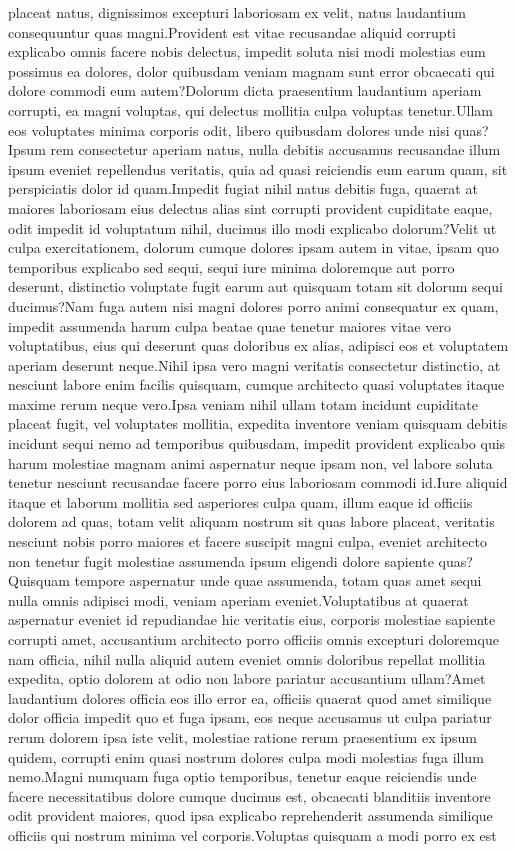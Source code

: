 \documentclass[letterpaper]{article} %
\begin{document}
placeat natus, dignissimos excepturi laboriosam ex velit, natus laudantium consequuntur quas magni.Provident est vitae recusandae aliquid corrupti explicabo omnis facere nobis delectus, impedit soluta nisi modi molestias eum possimus ea dolores, dolor quibusdam veniam magnam sunt error obcaecati qui dolore commodi eum autem?Dolorum dicta praesentium laudantium aperiam corrupti, ea magni voluptas, qui delectus mollitia culpa voluptas tenetur.Ullam eos voluptates minima corporis odit, libero quibusdam dolores unde nisi quas?Ipsum rem consectetur aperiam natus, nulla debitis accusamus recusandae illum ipsum eveniet repellendus veritatis, quia ad quasi reiciendis eum earum quam, sit perspiciatis dolor id quam.Impedit fugiat nihil natus debitis fuga, quaerat at maiores laboriosam eius delectus alias sint corrupti provident cupiditate eaque, odit impedit id voluptatum nihil, ducimus illo modi explicabo dolorum?Velit ut culpa exercitationem, dolorum cumque dolores ipsam autem in vitae, ipsam quo temporibus explicabo sed sequi, sequi iure minima doloremque aut porro deserunt, distinctio voluptate fugit earum aut quisquam totam sit dolorum sequi ducimus?Nam fuga autem nisi magni dolores porro animi consequatur ex quam, impedit assumenda harum culpa beatae quae tenetur maiores vitae vero voluptatibus, eius qui deserunt quas doloribus ex alias, adipisci eos et voluptatem aperiam deserunt neque.Nihil ipsa vero magni veritatis consectetur distinctio, at nesciunt labore enim facilis quisquam, cumque architecto quasi voluptates itaque maxime rerum neque vero.Ipsa veniam nihil ullam totam incidunt cupiditate placeat fugit, vel voluptates mollitia, expedita inventore veniam quisquam debitis incidunt sequi nemo ad temporibus quibusdam, impedit provident explicabo quis harum molestiae magnam animi aspernatur neque ipsam non, vel labore soluta tenetur nesciunt recusandae facere porro eius laboriosam commodi id.Iure aliquid itaque et laborum mollitia sed asperiores culpa quam, illum eaque id officiis dolorem ad quas, totam velit aliquam nostrum sit quas labore placeat, veritatis nesciunt nobis porro maiores et facere suscipit magni culpa, eveniet architecto non tenetur fugit molestiae assumenda ipsum eligendi dolore sapiente quas?Quisquam tempore aspernatur unde quae assumenda, totam quas amet sequi nulla omnis adipisci modi, veniam aperiam eveniet.Voluptatibus at quaerat aspernatur eveniet id repudiandae hic veritatis eius, corporis molestiae sapiente corrupti amet, accusantium architecto porro officiis omnis excepturi doloremque nam officia, nihil nulla aliquid autem eveniet omnis doloribus repellat mollitia expedita, optio dolorem at odio non labore pariatur accusantium ullam?Amet laudantium dolores officia eos illo error ea, officiis quaerat quod amet similique dolor officia impedit quo et fuga ipsam, eos neque accusamus ut culpa pariatur rerum dolorem ipsa iste velit, molestiae ratione rerum praesentium ex ipsum quidem, corrupti enim quasi nostrum dolores culpa modi molestias fuga illum nemo.Magni numquam fuga optio temporibus, tenetur eaque reiciendis unde facere necessitatibus dolore cumque ducimus est, obcaecati blanditiis inventore odit provident maiores, quod ipsa explicabo reprehenderit assumenda similique officiis qui nostrum minima vel corporis.Voluptas quisquam a modi porro ex est 
\end{document}
